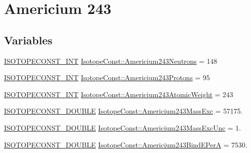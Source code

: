 \hypertarget{group___isotope_const-_americium-_am243}{}\section{Americium 243}
\label{group___isotope_const-_americium-_am243}
\subsection*{Variables}
\begin{DoxyCompactItemize}
\item 
\mbox{\hyperlink{group___isotope_const-_macros_ga5f18360b3e99483a35c32d789e62621c}{I\+S\+O\+T\+O\+P\+E\+C\+O\+N\+S\+T\+\_\+\+I\+NT}} \mbox{\hyperlink{group___isotope_const-_americium-_am243_gadc0332bb4cd000a22e76c4e7cd062cd0}{Isotope\+Const\+::\+Americium243\+Neutrons}} = 148
\item 
\mbox{\hyperlink{group___isotope_const-_macros_ga5f18360b3e99483a35c32d789e62621c}{I\+S\+O\+T\+O\+P\+E\+C\+O\+N\+S\+T\+\_\+\+I\+NT}} \mbox{\hyperlink{group___isotope_const-_americium-_am243_ga235b0ae186ca269d32ac9ca00ed77a71}{Isotope\+Const\+::\+Americium243\+Protons}} = 95
\item 
\mbox{\hyperlink{group___isotope_const-_macros_ga5f18360b3e99483a35c32d789e62621c}{I\+S\+O\+T\+O\+P\+E\+C\+O\+N\+S\+T\+\_\+\+I\+NT}} \mbox{\hyperlink{group___isotope_const-_americium-_am243_gaddfc3a2e129c17c0c170fd164d2c2907}{Isotope\+Const\+::\+Americium243\+Atomic\+Weight}} = 243
\item 
\mbox{\hyperlink{group___isotope_const-_macros_ga8f45a7272ce02c0b4c65c44636ed719a}{I\+S\+O\+T\+O\+P\+E\+C\+O\+N\+S\+T\+\_\+\+D\+O\+U\+B\+LE}} \mbox{\hyperlink{group___isotope_const-_americium-_am243_gac7a303d6a248b4823ac10b924741b0fb}{Isotope\+Const\+::\+Americium243\+Mass\+Exc}} = 57175.
\item 
\mbox{\hyperlink{group___isotope_const-_macros_ga8f45a7272ce02c0b4c65c44636ed719a}{I\+S\+O\+T\+O\+P\+E\+C\+O\+N\+S\+T\+\_\+\+D\+O\+U\+B\+LE}} \mbox{\hyperlink{group___isotope_const-_americium-_am243_ga57876bf57996731fa56a6f384cca3b9a}{Isotope\+Const\+::\+Americium243\+Mass\+Exc\+Unc}} = 1.
\item 
\mbox{\hyperlink{group___isotope_const-_macros_ga8f45a7272ce02c0b4c65c44636ed719a}{I\+S\+O\+T\+O\+P\+E\+C\+O\+N\+S\+T\+\_\+\+D\+O\+U\+B\+LE}} \mbox{\hyperlink{group___isotope_const-_americium-_am243_ga0e125a9d5c076ee32a1bb2d15aa6dd9b}{Isotope\+Const\+::\+Americium243\+Bind\+E\+PerA}} = 7530.
\item 

\end{DoxyCompactItemize}
